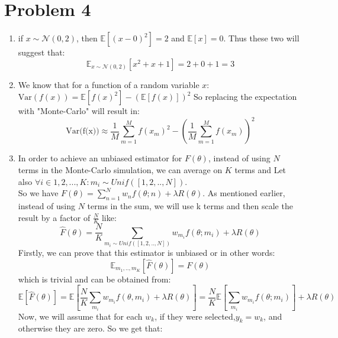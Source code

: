 \documentclass{article}
\begin{document}
\section{Problem 4}
\begin{enumerate}
    \item if $x \sim  \mathcal{N}(0,2)$, then $\mathbb{E}[(x-0)^2] = 2$ and $\mathbb{E}[x] = 0$. Thus these two will suggest that:
    \begin{equation*}
        \mathbb{E}_{x \sim  \mathcal{N}(0,2)}[x^2 + x + 1] = 2 + 0 + 1 = 3
    \end{equation*}
    \item We know that for a function of a random variable $x$: 
    $\text{Var}(f(x)) = \mathbb{E} [f(x)^2] - (\mathbb{E} [f(x)])^2$
    So replacing the expectation with "Monte-Carlo" will result in:
    \begin{equation*}
        \text{Var(f(x))} \approx \frac{1}{M} \sum_{m=1}^M f(x_m)^2 - (\frac{1}{M}   \sum_{m=1}^M f(x_m))^2 
    \end{equation*}
    \item In order to achieve an unbiased estimator for $F(\theta)$, instead of using $N$ terms in the Monte-Carlo simulation, we can average on $K$ terms and Let also $\forall i \in {1,2,...,K} : m_i \sim Unif([1,2,..,N])$. \\
    So we have $F(\theta) = \sum_{n=1}^N w_n f(\theta; n) + \lambda R(\theta)$. As mentioned earlier, instead of using $N$ terms in the sum, we will use k terms and then scale the result by a factor of $\frac{N}{K}$ like:
    \begin{equation*}
        \hat{F}(\theta) = \frac{N}{K} \sum_{m_i \sim  Unif([1,2,..,N])}  w_{m_i} 
        f(\theta; m_i) + \lambda R(\theta)
    \end{equation*}
    Firstly, we can prove that this estimator is unbiased or in other words: 
    \begin{equation*}
    \mathbb{E}_{m_1 ,.., m_K} [\hat{F}(\theta)] = F(\theta)
    \end{equation*}
    which is trivial and can be obtained from:
    \begin{equation*}
        \mathbb{E}[ \hat{F}(\theta) ] = \mathbb{E} [\frac{N}{K} \sum_{m_i }  w_{m_i} f(\theta, m_i) + \lambda R(\theta) ] = \frac{N}{K} \mathbb{E} [ \sum_{m_i }  w_{m_i} f(\theta; m_i)] + \lambda R(\theta)
    \end{equation*}
    Now, we will assume that for each $w_k$, if they were selected,$y_k = w_k$, and otherwise they are zero. So we get that:

\end{enumerate}
\end{document}
